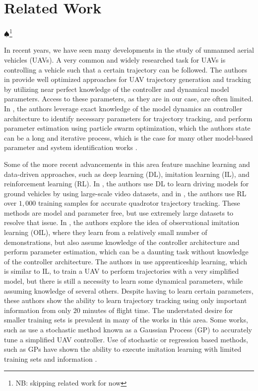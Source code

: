 \documentclass[letterpaper, 10 pt, conference]{ieeeconf}  %
\newcommand\NB[1]{$\spadesuit$\footnote{NB: #1}}
\begin{document}
\section{Related Work}
\NB{skipping related work for now}

In recent years, we have seen many developments in the study of unmanned aerial vehicles (UAVs). A very common and widely researched task for UAVs is controlling a vehicle such that a certain trajectory can be followed. The authors in \cite{minsnap,waypts,tvec} provide well optimized approaches for UAV trajectory generation and tracking by utilizing near perfect knowledge of the controller and dynamical model parameters. Access to these parameters, as they are in our case, are often limited. In \cite{pso}, the authors leverage exact knowledge of the model dynamics an controller architecture to identify necessary parameters for trajectory tracking, and perform parameter estimation using particle swarm optimization, which the authors state can be a long and iterative process, which is the case for many other model-based parameter and system identification works \cite{modelbased1,modelbased2}.

Some of the more recent advancements in this area feature machine learning and data-driven approaches, such as deep learning (DL), imitation learning (IL), and reinforcement learning (RL). In \cite{dln}, the authors use DL to learn driving models for ground vehicles by using large-scale video datasets, and in \cite{rlctrl}, the authors use RL over $1,000$ training samples for accurate quadrotor trajectory tracking. These methods are model and parameter free, but use extremely large datasets to resolve that issue. In \cite{uavrace}, the authors explore the idea of observational imitation learning (OIL), where they learn from a relatively small number of demonstrations, but also assume knowledge of the controller architecture and perform parameter estimation, which can be a daunting task without knowledge of the controller architecture. The authors in \cite{abbeel} use apprenticeship learning, which is similar to IL, to train a UAV to perform trajectories with a very simplified model, but there is still a necessity to learn some dynamical parameters, while assuming knowledge of several others. Despite having to learn certain parameters, these authors show the ability to learn trajectory tracking using only important information from only $20$ minutes of flight time. The understated desire for smaller training sets is prevalent in many of the works in this area. Some works, such as \cite{gppaper} use a stochastic method known as a Gaussian Process (GP) to accurately tune a simplified UAV controller. Use of stochastic or regression based methods, such as GPs have shown the ability to execute imitation learning with limited training sets and information \cite{imlerngp,imlernreg}.
\end{document}
